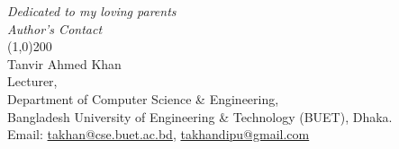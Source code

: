  \newpage
 \begin{flushright}
 \vspace{40cm}
 	 \textit{\Large Dedicated to my loving parents}\\
 \vspace{15cm}
 \textit{\Large \sc Author's Contact}\\
 \line(1,0){200}\\
Tanvir Ahmed Khan\\
Lecturer,\\
Department of Computer Science \& Engineering, \\
Bangladesh University of Engineering \& Technology (BUET), Dhaka.\\
Email: \href{mailto:takhan@cse.buet.ac.bd}{takhan@cse.buet.ac.bd},  \href{mailto:takhandipu@gmail.com}{takhandipu@gmail.com} \\
 \end{flushright}
 \newpage
